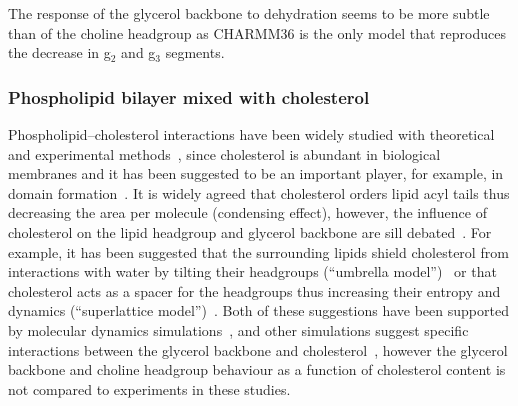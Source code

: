 \documentclass[pre,aps,floatfix,authordate1-4,twocolumn]{revtex4-1}
\begin{document}
The response of the glycerol backbone to dehydration seems to be more subtle than of the choline headgroup 
as CHARMM36 is the only model that reproduces the decrease in g$_2$ and g$_3$ segments.


\subsubsection{Phospholipid bilayer mixed with cholesterol}
Phospholipid--cholesterol interactions have been widely studied with theoretical~\cite{huang99,zhu07,rog09,alwarawrah12} and
experimental methods~\cite{brown78,marsh10,ferreira13,marsh13}, since cholesterol is abundant in biological membranes and
it has been suggested to be an important player, for example, in domain formation~\cite{simons04,somerharju09}.
It is widely agreed that cholesterol orders lipid acyl tails thus decreasing the area per molecule (condensing effect),
however, the influence of cholesterol on the lipid headgroup and glycerol backbone are sill debated~\cite{huang99,simons04,somerharju09}.
For example, it has been suggested that the surrounding lipids shield cholesterol from interactions with water by 
tilting their headgroups (``umbrella model'')~\cite{huang99} or that cholesterol acts as a spacer for the headgroups thus increasing 
their entropy and dynamics (``superlattice model'')~\cite{somerharju09}. Both of these suggestions have been supported
by molecular dynamics simulations~\cite{zhu07,alwarawrah12}, and other simulations suggest specific
interactions between the glycerol backbone and cholesterol~\cite{rog09}, however the glycerol backbone and choline headgroup behaviour
as a function of cholesterol content is not compared to experiments in these studies. 
\end{document}
